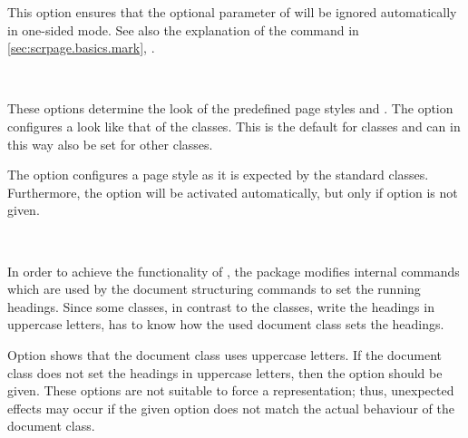 \begin{Declaration}
\end{Declaration}%
%
This option ensures that the optional parameter of
 will be ignored automatically in
one-sided mode. See also the explanation of the command
 in \autoref{sec:scrpage.basics.mark},
.%
%
%
%
%
%


\begin{Declaration}
  \\
\end{Declaration}%
%
%
These options determine the look of the predefined page styles
 and . The option
 configures a look like that of the {\KOMAScript} classes.
This is the default for {\KOMAScript} classes and can in this way also be set
for other classes.

The option  configures a page style as it is
expected by the standard classes. Furthermore, the option
 will be activated automatically, but only if
option  is not given.%
%


\begin{Declaration}
\\
\end{Declaration}%
%
%
In order to achieve the functionality of , the package
 modifies internal commands which are used by the
document structuring commands to set the running headings.  Since some
classes, in contrast to the {\KOMAScript} classes, write the headings
in uppercase letters,  has to know how the used
document class sets the headings.

Option  shows  that the document class
uses uppercase letters.  If the document class does not set the headings in
uppercase letters, then the option  should be given.
These options are not suitable to force a representation;
thus, unexpected effects may occur if the given option does not match the
actual behaviour of the document class.%


